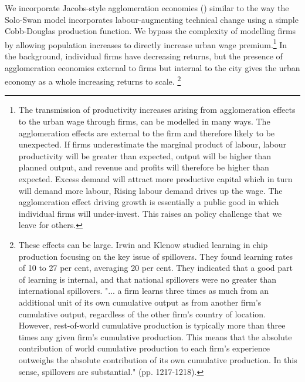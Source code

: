 We  incorporate Jacobs-style agglomeration economies (\cite{beaudryWhoRightMarshall2009, vanderpanneAgglomerationExternalitiesMarshall2004, jacobsEconomyCities1969})  similar to the way the  Solo-Swan model incorporates  labour-augmenting technical change using a simple Cobb-Douglas production function.  We bypass the complexity of modelling firms  by allowing population increases  to directly increase urban wage premium.\footnote{The transmission of productivity increases arising from agglomeration effects  to the urban wage through firms, can be modelled in many ways. The agglomeration effects are external to the firm and therefore likely to be unexpected. If  firms underestimate the marginal product of labour, labour productivity will be greater than expected, output will be higher than planned output, and revenue and profits will therefore be higher than expected. Excess demand will attract more productive capital which in turn will demand more labour,  Rising labour demand drives up the wage. The agglomeration effect driving growth is essentially a public good in which individual firms will under-invest. This raises an policy challenge that we leave for others.} %
In the background, individual firms have decreasing returns, but the presence of agglomeration economies external to firms but internal to the city gives the urban economy as a whole increasing returns to scale. \footnote{These effects can be large. Irwin and Klenow  studied learning in chip production focusing  on the key issue of spillovers. They found learning rates of 10 to 27 per cent, averaging 20 per cent. They indicated that a good part of learning is internal, and that national spillovers were no greater than international spillovers. "... a firm learns three times as much from an additional unit of its own cumulative output as from another firm's cumulative output, regardless of the other firm's country of location. However, rest-of-world cumulative production is typically more than three times any given firm's cumulative production. This means that the absolute contribution of world cumulative production to each firm's experience outweighs the absolute contribution of its own cumulative production. In this sense, spillovers are substantial." (pp. 1217-1218).} 


